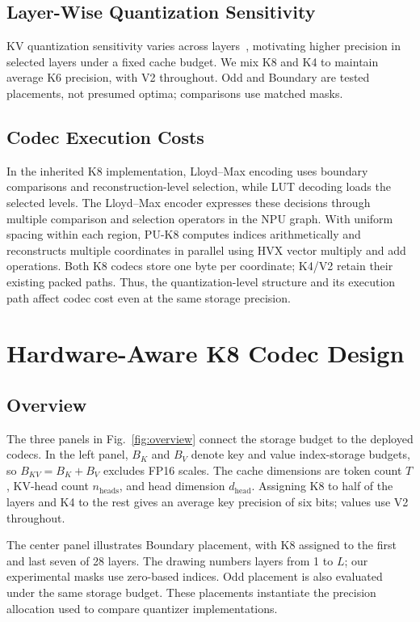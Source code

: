 \documentclass[conference,a4paper,10pt]{IEEEtran}
\begin{document}
\subsection{Layer-Wise Quantization Sensitivity}
KV quantization sensitivity varies across layers~\cite{kvtuner}, motivating higher precision in selected layers under a fixed cache budget. We mix K8 and K4 to maintain average K6 precision, with V2 throughout. Odd and Boundary are tested placements, not presumed optima; comparisons use matched masks.

\subsection{Codec Execution Costs}
In the inherited K8 implementation, Lloyd--Max encoding uses boundary comparisons and reconstruction-level selection, while LUT decoding loads the selected levels. The Lloyd--Max encoder expresses these decisions through multiple comparison and selection operators in the NPU graph. With uniform spacing within each region, PU-K8 computes indices arithmetically and reconstructs multiple coordinates in parallel using HVX vector multiply and add operations. Both K8 codecs store one byte per coordinate; K4/V2 retain their existing packed paths. Thus, the quantization-level structure and its execution path affect codec cost even at the same storage precision.

\section{Hardware-Aware K8 Codec Design}
\label{sec:method}
\subsection{Overview}
The three panels in Fig.~\ref{fig:overview} connect the storage budget to the deployed codecs. In the left panel, $B_K$ and $B_V$ denote key and value index-storage budgets, so $B_{KV}=B_K+B_V$ excludes FP16 scales. The cache dimensions are token count $T$, KV-head count $n_{\mathrm{heads}}$, and head dimension $d_{\mathrm{head}}$. Assigning K8 to half of the layers and K4 to the rest gives an average key precision of six bits; values use V2 throughout.

The center panel illustrates Boundary placement, with K8 assigned to the first and last seven of 28 layers. The drawing numbers layers from 1 to $L$; our experimental masks use zero-based indices. Odd placement is also evaluated under the same storage budget. These placements instantiate the precision allocation used to compare quantizer implementations.
\end{document}
